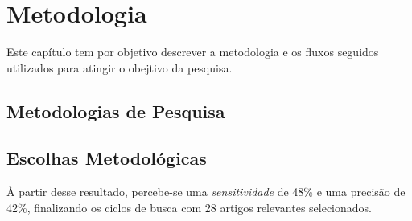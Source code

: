 \chapter[Metodologia]{Metodologia}

Este capítulo tem por objetivo descrever a metodologia e os fluxos seguidos utilizados para atingir o obejtivo da pesquisa. 


\section{Metodologias de Pesquisa}

\section{Escolhas Metodológicas}

À partir desse resultado, percebe-se uma \textit{sensitividade} de 48\% e uma precisão de 42\%, finalizando os ciclos de busca com 28 artigos relevantes selecionados.  

